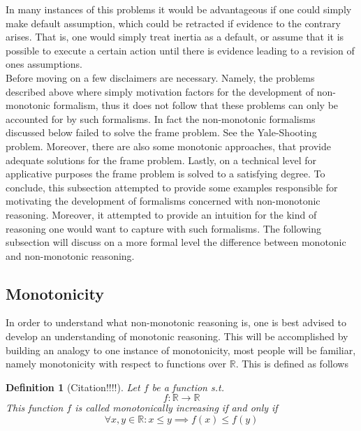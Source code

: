 \documentclass{article}
\newtheorem{mydef}[thm]{Definition}
\begin{document}
In many instances of this problems it would be advantageous if one could simply make default assumption, which could be retracted if evidence to the contrary arises.
That is, one would simply treat inertia as a default, or assume that it is possible to execute a certain action until there is evidence leading to a revision of ones assumptions. \\
Before moving on a few disclaimers are necessary. Namely, the problems described above where simply motivation factors for the development of non-monotonic formalism, thus it does not follow that these problems can only be accounted for by such formalisms. In fact 
the non-monotonic formalisms discussed below failed to solve the frame problem. See the Yale-Shooting problem. Moreover, there are also some monotonic approaches, that provide adequate solutions for the frame problem. Lastly, on a technical level for applicative purposes the frame problem is solved to a satisfying degree. \cite{stanford2016frame}
To conclude, this subsection attempted to provide some examples responsible for motivating the development of formalisms concerned with non-monotonic reasoning. Moreover, it attempted to provide an intuition for the kind of reasoning one would want to capture with such formalisms. The following subsection will discuss on a more formal level the difference between monotonic and non-monotonic reasoning.

\subsection*{Monotonicity}

In order to understand what non-monotonic reasoning is, one is best advised to develop an understanding of monotonic reasoning. This will be accomplished by building an analogy to one instance of monotonicity, most people will be familiar, namely monotonicity with respect to functions over $\mathbb{R}$. This is defined as follows


\begin{mydef}[Citation!!!!]
    Let $f$ be a function s.t.
    \begin{equation*}
        f: \mathbb{R} \to \mathbb{R}
    \end{equation*}
    This function $f$ is called monotonically increasing if and only if
    \begin{equation*}
        \forall x,y \in \mathbb{R}: x \leq y \implies f(x) \leq f(y)
    \end{equation*}
\end{mydef} 
\end{document}
